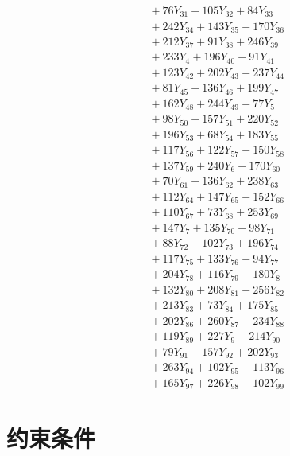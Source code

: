 \documentclass[a4paper,10pt]{article}
\begin{document}
{\begin{align}
&\quad  + 76Y_{31} + 105Y_{32} + 84Y_{33} \\[0.5ex]
&\quad  + 242Y_{34} + 143Y_{35} + 170Y_{36} \\[0.5ex]
&\quad  + 212Y_{37} + 91Y_{38} + 246Y_{39} \\[0.5ex]
&\quad  + 233Y_{4} + 196Y_{40} + 91Y_{41} \\[0.5ex]
&\quad  + 123Y_{42} + 202Y_{43} + 237Y_{44} \\[0.5ex]
&\quad  + 81Y_{45} + 136Y_{46} + 199Y_{47} \\[0.5ex]
&\quad  + 162Y_{48} + 244Y_{49} + 77Y_{5} \\[0.5ex]
&\quad  + 98Y_{50} + 157Y_{51} + 220Y_{52} \\[0.5ex]
&\quad  + 196Y_{53} + 68Y_{54} + 183Y_{55} \\[0.5ex]
&\quad  + 117Y_{56} + 122Y_{57} + 150Y_{58} \\[0.5ex]
&\quad  + 137Y_{59} + 240Y_{6} + 170Y_{60} \\[0.5ex]
&\quad  + 70Y_{61} + 136Y_{62} + 238Y_{63} \\[0.5ex]
&\quad  + 112Y_{64} + 147Y_{65} + 152Y_{66} \\[0.5ex]
&\quad  + 110Y_{67} + 73Y_{68} + 253Y_{69} \\[0.5ex]
&\quad  + 147Y_{7} + 135Y_{70} + 98Y_{71} \\[0.5ex]
&\quad  + 88Y_{72} + 102Y_{73} + 196Y_{74} \\[0.5ex]
&\quad  + 117Y_{75} + 133Y_{76} + 94Y_{77} \\[0.5ex]
&\quad  + 204Y_{78} + 116Y_{79} + 180Y_{8} \\[0.5ex]
&\quad  + 132Y_{80} + 208Y_{81} + 256Y_{82} \\[0.5ex]
&\quad  + 213Y_{83} + 73Y_{84} + 175Y_{85} \\[0.5ex]
&\quad  + 202Y_{86} + 260Y_{87} + 234Y_{88} \\[0.5ex]
&\quad  + 119Y_{89} + 227Y_{9} + 214Y_{90} \\[0.5ex]
&\quad  + 79Y_{91} + 157Y_{92} + 202Y_{93} \\[0.5ex]
&\quad  + 263Y_{94} + 102Y_{95} + 113Y_{96} \\[0.5ex]
&\quad  + 165Y_{97} + 226Y_{98} + 102Y_{99}\nonumber
\end{align}
}

\section{约束条件}
\end{document}
